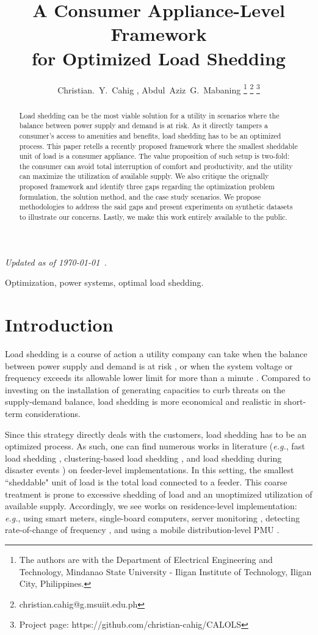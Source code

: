 \documentclass[journal, a4paper]{IEEEtran}
\title{A Consumer Appliance-Level Framework\\for Optimized Load Shedding}
\author{
	Christian.~Y.~Cahig \textsuperscript{\faIcon[regular]{envelope}}, Abdul~Aziz~G.~Mabaning%
\thanks{
	The authors are with the Department of Electrical Engineering and Technology,
	Mindanao State University - Iligan Institute of Technology,
	Iligan City, Philippines.
}%
\thanks{\faIcon[regular]{envelope} {\color{blue}christian.cahig@g.msuiit.edu.ph}}%
\thanks{\faIcon{github} Project page: {\color{blue}https://github.com/christian-cahig/CALOLS}}
}
\begin{document}
\maketitle

\noindent
\textit{Updated as of {\today\ \currenttime}.}\\

\begin{abstract}
Load shedding can be the most viable solution for a utility in scenarios where the balance between power supply and demand is at risk.
As it directly tampers a consumer's access to amenities and benefits, load shedding has to be an optimized process.
This paper retells a recently proposed framework where the smallest sheddable unit of load is a consumer appliance.
The value proposition of such setup is two-fold:
the consumer can avoid total interruption of comfort and productivity,
and the utility can maximize the utilization of available supply.
We also critique the orignally proposed framework
and identify three gaps regarding
the optimization problem formulation,
the solution method, and
the case study scenarios.
We propose methodologies to address the said gaps
and present experiments on synthetic datasets to illustrate our concerns.
Lastly, we make this work entirely available to the public.
\end{abstract}

\begin{IEEEkeywords}
Optimization, power systems, optimal load shedding.
\end{IEEEkeywords}

\section{Introduction}
\label{sec: Introduction}

Load shedding is a course of action a utility company can take
when the balance between power supply and demand is at risk \cite{Jabian2018},
or when the system voltage or frequency exceeds its allowable lower limit for more than a minute \cite{GMC2016}.
Compared to investing on the installation of generating capacities to curb threats on the supply-demand balance,
load shedding is more economical and realistic in short-term considerations.

Since this strategy directly deals with the customers, load shedding has to be an optimized process.
As such, one can find numerous works in literature
(\textit{e.g.},
fast load shedding \cite{Wester2014},
clustering-based load shedding \cite{Potel2019}, and
load shedding during disaster events \cite{Babaei2020})
on feeder-level implementations.
In this setting, the smallest ``sheddable" unit of load is the total load connected to a feeder.
This coarse treatment is prone to excessive shedding of load and an unoptimized utilization of available supply.
Accordingly, we see works on residence-level implementation:
\textit{e.g.},
using smart meters, single-board computers, server monitoring \cite{Bhattacherjee2019},
detecting rate-of-change of frequency \cite{Sigrist2015},
and using a mobile distribution-level PMU \cite{Yao2020}.
\end{document}
